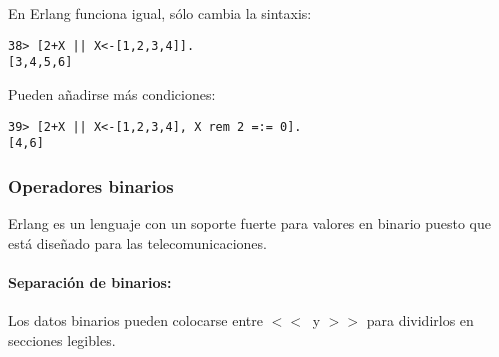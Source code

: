 En Erlang funciona igual, sólo cambia la sintaxis:
\begin{lstlisting}
38> [2+X || X<-[1,2,3,4]].
[3,4,5,6]
\end{lstlisting}

Pueden añadirse más condiciones:
\begin{lstlisting}
39> [2+X || X<-[1,2,3,4], X rem 2 =:= 0].
[4,6]
\end{lstlisting}

\subsubsection{Operadores binarios}

Erlang es un lenguaje con un soporte fuerte para valores en binario puesto que está diseñado para las
telecomunicaciones.

\paragraph{Separación de binarios:} Los datos binarios pueden colocarse entre $<<\:$  y $>>$ para dividirlos
en secciones legibles.


